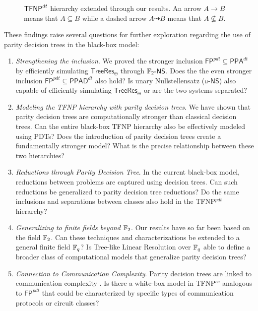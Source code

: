 \begin{figure}[H]

    
    \caption{$\mathsf{TFNP}^{dt}$ hierarchy extended through our results. An arrow $A \to B$ means that $A \subseteq B$ while a dashed arrow $A \dashrightarrow B$ means that $A \not\subseteq B$.}   
\end{figure} 

\noindent
These findings raise several questions for further exploration regarding the use of parity decision trees in the black-box model:
\begin{enumerate}
    \item \textit{Strengthening the inclusion}. We proved the stronger inclusion $\textsf{FP}^{pdt} \subseteq \mathsf{PPA}^{dt}$ by efficiently simulating $\mathsf{TreeRes}_\oplus$ through $\mathsf{\mathbb{F}_2\text{-}NS}$. Does the the even stronger inclusion $\textsf{FP}^{pdt} \subseteq \mathsf{PPAD}^{dt}$ also hold? Is unary Nullstellensatz ($\mathsf{u\text{-}NS}$) also capable of efficiently simulating $\mathsf{TreeRes}_\oplus$ or are the two systems separated?  
    \item \textit{Modeling the \textsf{TFNP} hierarchy with parity decision trees}. We have shown that parity decision trees are computationally stronger than classical decision trees. Can the entire black-box \textsf{TFNP} hierarchy also be effectively modeled using PDTs? Does the introduction of parity decision trees create a fundamentally stronger model? What is the precise relationship between these two hierarchies?
    \item \textit{Reductions through Parity Decision Tree}. In the current black-box model, reductions between problems are captured using decision trees. Can such reductions be generalized to parity decision tree reductions? Do the same inclusions and separations between classes also hold in the \textsf{TFNP}$^{pdt}$ hierarchy?
    \item \textit{Generalizing to finite fields beyond $\mathbb{F}_2$}. Our results have so far been based on the field $\mathbb{F}_2$. Can these techniques and characterizations be extended to a general finite field $\mathbb{F}_q$? Is Tree-like Linear Resolution over $\mathbb{F}_q$ able to define a broader class of computational models that generalize parity decision trees?
    \item \textit{Connection to Communication Complexity}. Parity decision trees are linked to communication complexity  \cite{pdts_comm_compl}. Is there a white-box model in \textsf{TFNP}$^{cc}$ analogous to $\textsf{FP}^{pdt}$ that could be characterized by specific types of communication protocols or circuit classes?
\end{enumerate}